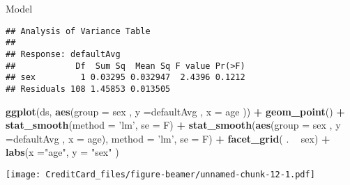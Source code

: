 \documentclass[ignorenonframetext,]{beamer}
\newenvironment{Shaded}{\begin{snugshade}}{\end{snugshade}}
\newcommand{\KeywordTok}[1]{\textcolor[rgb]{0.13,0.29,0.53}{\textbf{#1}}}
\newcommand{\DataTypeTok}[1]{\textcolor[rgb]{0.13,0.29,0.53}{#1}}
\newcommand{\StringTok}[1]{\textcolor[rgb]{0.31,0.60,0.02}{#1}}
\newcommand{\OperatorTok}[1]{\textcolor[rgb]{0.81,0.36,0.00}{\textbf{#1}}}
\newcommand{\NormalTok}[1]{#1}
\begin{document}
\begin{frame}[fragile]{Model}
\begin{verbatim}
## Analysis of Variance Table
## 
## Response: defaultAvg
##            Df  Sum Sq  Mean Sq F value Pr(>F)
## sex         1 0.03295 0.032947  2.4396 0.1212
## Residuals 108 1.45853 0.013505
\end{verbatim}

\begin{Shaded}
\begin{Highlighting}[]
\KeywordTok{ggplot}\NormalTok{(ds, }\KeywordTok{aes}\NormalTok{(}\DataTypeTok{group =}\NormalTok{ sex , }
               \DataTypeTok{y =}\NormalTok{defaultAvg , }\DataTypeTok{x =}\NormalTok{ age )) }\OperatorTok{+}
\StringTok{  }\KeywordTok{geom_point}\NormalTok{() }\OperatorTok{+}
\StringTok{  }\KeywordTok{stat_smooth}\NormalTok{(}\DataTypeTok{method =} \StringTok{'lm'}\NormalTok{, }\DataTypeTok{se =}\NormalTok{ F) }\OperatorTok{+}
\StringTok{  }\KeywordTok{stat_smooth}\NormalTok{(}\KeywordTok{aes}\NormalTok{(}\DataTypeTok{group =}\NormalTok{ sex , }
                  \DataTypeTok{y =}\NormalTok{defaultAvg , }\DataTypeTok{x =}\NormalTok{ age), }
              \DataTypeTok{method =} \StringTok{'lm'}\NormalTok{, }\DataTypeTok{se =}\NormalTok{ F) }\OperatorTok{+}\StringTok{ }
\StringTok{  }\KeywordTok{facet_grid}\NormalTok{( . }\OperatorTok{~}\StringTok{  }\NormalTok{sex) }\OperatorTok{+}
\StringTok{  }\KeywordTok{labs}\NormalTok{(}\DataTypeTok{x =}\StringTok{"age"}\NormalTok{, }\DataTypeTok{y =} \StringTok{"sex"}\NormalTok{ )}
\end{Highlighting}
\end{Shaded}

\texttt{[image: CreditCard\_files/figure-beamer/unnamed-chunk-12-1.pdf]}

\end{frame}
\end{document}
